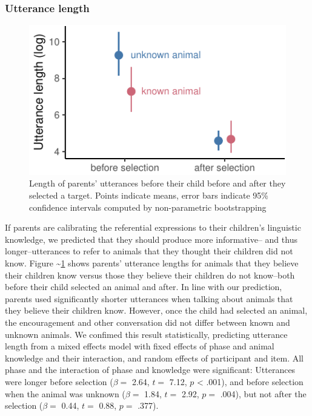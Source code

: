 \documentclass[10pt, letterpaper]{article}
\newenvironment{CodeChunk}{}{}
\begin{document}
\hypertarget{utterance-length}{%
\subsubsection{Utterance length}\label{utterance-length}}

\begin{CodeChunk}
\begin{figure}[tb]
\includegraphics{figs/known_plot-1} \caption[Length of parents' utterances before their child before and after they selected a target]{Length of parents' utterances before their child before and after they selected a target. Points indicate means, error bars indicate 95\% confidence intervals computed by non-parametric bootstrapping}\label{fig:known_plot}
\end{figure}
\end{CodeChunk}

If parents are calibrating the referential expressions to their
children's linguistic knowledge, we predicted that they should produce
more informative-- and thus longer--utterances to refer to animals that
they thought their children did not know. Figure
\textasciitilde{}\ref{fig:known_plot} shows parents' utterance lengths
for animals that they believe their children know versus those they
believe their children do not know--both before their child selected an
animal and after. In line with our prediction, parents used
significantly shorter utterances when talking about animals that they
believe their children know. However, once the child had selected an
animal, the encouragement and other conversation did not differ between
known and unknown animals. We confimed this result statistically,
predicting utterance length from a mixed effects model with fixed
effects of phase and animal knowledge and their interaction, and random
effects of participant and item. All phase and the interaction of phase
and knowledge were significant: Utterances were longer before selection
(\(\beta =\) 2.64, \(t =\) 7.12, \(p\) \textless{} .001), and before
selection when the animal was unknown (\(\beta =\) 1.84, \(t =\) 2.92,
\(p =\) .004), but not after the selection (\(\beta =\) 0.44, \(t =\)
0.88, \(p =\) .377).
\end{document}
